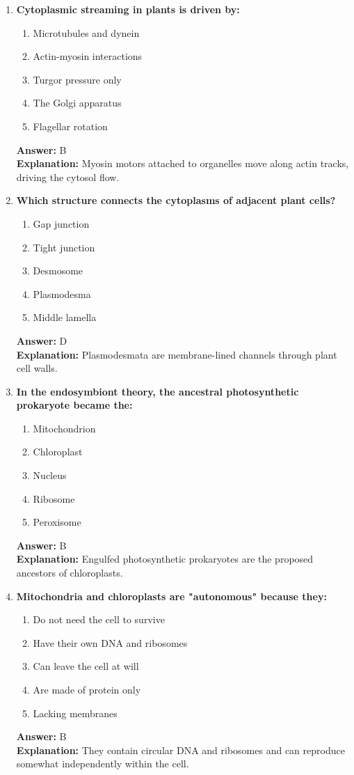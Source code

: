 \documentclass[11pt, a4paper]{article}
\begin{document}
\begin{enumerate}[leftmargin=*, label=\arabic*.]
\item \textbf{Cytoplasmic streaming in plants is driven by:}
\begin{enumerate}[label=\Alph*.]
\item Microtubules and dynein
\item Actin-myosin interactions
\item Turgor pressure only
\item The Golgi apparatus
\item Flagellar rotation
\end{enumerate}
\textbf{Answer:} B \\
\textbf{Explanation:} Myosin motors attached to organelles move along actin tracks, driving the cytosol flow.

\item \textbf{Which structure connects the cytoplasms of adjacent plant cells?}
\begin{enumerate}[label=\Alph*.]
\item Gap junction
\item Tight junction
\item Desmosome
\item Plasmodesma
\item Middle lamella
\end{enumerate}
\textbf{Answer:} D \\
\textbf{Explanation:} Plasmodesmata are membrane-lined channels through plant cell walls.

\item \textbf{In the endosymbiont theory, the ancestral photosynthetic prokaryote became the:}
\begin{enumerate}[label=\Alph*.]
\item Mitochondrion
\item Chloroplast
\item Nucleus
\item Ribosome
\item Peroxisome
\end{enumerate}
\textbf{Answer:} B \\
\textbf{Explanation:} Engulfed photosynthetic prokaryotes are the proposed ancestors of chloroplasts.

\item \textbf{Mitochondria and chloroplasts are "autonomous" because they:}
\begin{enumerate}[label=\Alph*.]
\item Do not need the cell to survive
\item Have their own DNA and ribosomes
\item Can leave the cell at will
\item Are made of protein only
\item Lacking membranes
\end{enumerate}
\textbf{Answer:} B \\
\textbf{Explanation:} They contain circular DNA and ribosomes and can reproduce somewhat independently within the cell.


\end{enumerate}
\end{document}

